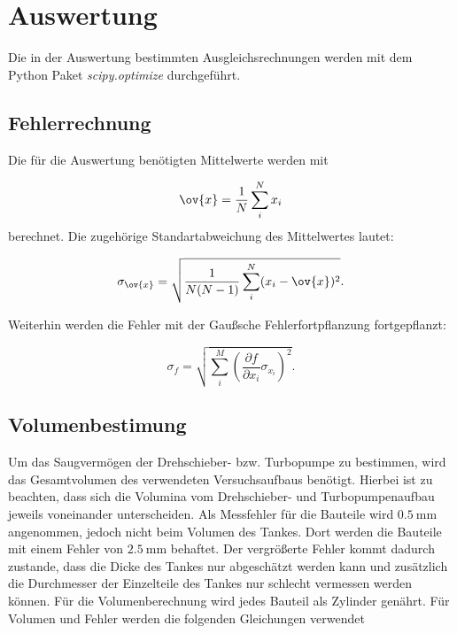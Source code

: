 \section{Auswertung}

Die in der Auswertung bestimmten Ausgleichsrechnungen werden mit
dem Python Paket \emph{scipy.optimize}\cite{scipy} durchgeführt.

\subsection{Fehlerrechnung}

Die für die Auswertung benötigten Mittelwerte werden mit

\begin{equation}
  \label{eq: mittel}
  \ov{x}=\frac{1}{N}\sum_i^N x_i
\end{equation}
berechnet. Die zugehörige Standartabweichung des Mittelwertes lautet:

\begin{equation}
  \label{eq: standartabweichung}
  \sigma_{\ov{x}}=\sqrt{ \frac{1}{N(N-1)} \sum_i^N (x_i-\ov{x})^2}.
\end{equation}

Weiterhin werden die Fehler mit der Gaußsche Fehlerfortpflanzung fortgepflanzt:

\begin{equation}
  \label{eq: gauss_fehler}
  \sigma_f= \sqrt{ \sum_i^M \left(\frac{\partial f}{\partial x_i} \sigma_{x_i}\right)^2}.
\end{equation}

\subsection{Volumenbestimung}

Um das Saugvermögen der Drehschieber- bzw. Turbopumpe zu bestimmen, wird das Gesamtvolumen des verwendeten Versuchsaufbaus benötigt.
Hierbei ist zu beachten, dass sich die Volumina vom Drehschieber- und Turbopumpenaufbau jeweils voneinander unterscheiden.
Als Messfehler für die Bauteile wird $\SI{0.5}{\milli\meter}$ angenommen, jedoch nicht beim Volumen des Tankes. Dort werden die
Bauteile mit einem Fehler von $\SI{2.5}{\milli\meter}$ behaftet. Der vergrößerte Fehler kommt dadurch zustande, dass die
Dicke des Tankes nur abgeschätzt werden kann und zusätzlich die Durchmesser der Einzelteile des Tankes nur schlecht vermessen werden können.
Für die Volumenberechnung wird jedes Bauteil als Zylinder genährt.  Für Volumen und Fehler werden die folgenden Gleichungen verwendet

